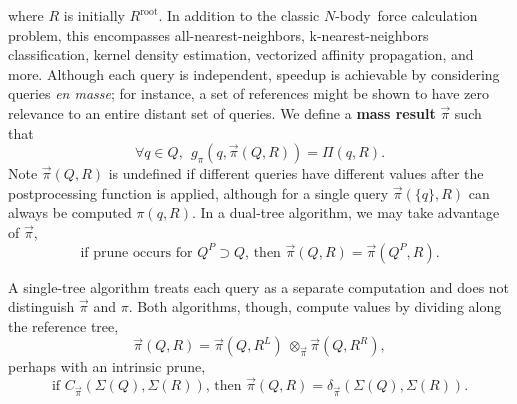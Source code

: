 \documentclass[times, 10pt,twocolumn]{article}
\DeclareMathOperator{\hrect}{hrect}
\newcommand{\defterm}[1]{{\bf #1}}
\newcommand{\nbody}{$N$-body}
\newcommand{\kdroot}[1]{#1^{\text{root}}}
\newcommand{\kdleft}[1]{#1^{\!L}}
\newcommand{\kdright}[1]{#1^{\!R}}
\newcommand{\kdparent}[1]{#1^{\!P}}
\newcommand{\myOp}[1]{\mathop{\bigotimes\nolimits\!\!_{#1}}}
\newcommand{\myop}[1]{{\scriptstyle\:}\otimes_{\!#1}}
\newcommand{\outpi}{\Pi}
\newcommand{\gpi}{g_{\outpi}}
\newcommand{\Oprho}{\myOp{\rho}}
\newcommand{\frho}{f_{\rho}}
\newcommand{\letterqr}{\pi}
\newcommand{\outqr}{\Pi}
\newcommand{\inqr}{\pi}
\newcommand{\gqr}{g_{\letterqr}}
\newcommand{\letterqrv}{\vec{\pi}}
\newcommand{\inqrv}{\vec{\pi}}
\newcommand{\opqrv}{\myop{\letterqrv}}
\newcommand{\deltaqrv}{\delta_{\letterqrv}}
\newcommand{\canpruneqrv}{C_{\letterqrv}}
\newcommand{\namestat}[1]{\Sigma_{\text{#1}}}
\newcommand{\outstat}{\Sigma}
\begin{document}
\noindent where $R$ is initially $\kdroot{R}$.
In addition to the classic \nbody\ force calculation problem, this encompasses all-nearest-neighbors, k-nearest-neighbors classification, kernel density estimation, vectorized affinity propagation, and more.
Although each query is independent, speedup is achievable by considering queries {\it en masse}; for instance, a set of references might be shown to have zero relevance to an entire distant set of queries.
We define a \defterm{mass result} $\inqrv$ such that
\begin{equation}
\forall q \in Q,~~ \gqr(q, \inqrv(Q, R)) = \outqr(q, R).
\end{equation}
\noindent Note $\inqrv(Q,R)$ is undefined if different queries have different values after the postprocessing function is applied, although for a single query $\inqrv(\{q\}, R)$ can always be computed $\inqr(q, R)$.
In a dual-tree algorithm, we may take advantage of $\inqrv$,
\begin{equation}
\text{if prune occurs for } \kdparent{Q} \supset Q \text{, then } \inqrv(Q, R) = \inqrv(\kdparent{Q}, R).
\label{eqn:parentqrv}
\end{equation}

\noindent
A single-tree algorithm treats each query as a separate computation and does not distinguish $\inqrv$ and $\inqr$.
Both algorithms, though, compute values by dividing along the reference tree,
\begin{equation}
\inqrv(Q, R) = \inqrv(Q, \kdleft{R}) \opqrv \inqrv(Q, \kdright{R}),
\label{eqn:dividepi}
\end{equation}
\noindent perhaps with an intrinsic prune,
\begin{equation}
\text{if } \canpruneqrv(\outstat(Q), \outstat(R)) \text{, then } \inqrv(Q, R) = \deltaqrv(\outstat(Q), \outstat(R)).
\label{eqn:prunepi}
\end{equation}


\end{document}
